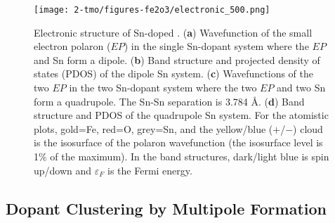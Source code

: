 

\begin{figure}
    \centering
    \texttt{[image: 2-tmo/figures-fe2o3/electronic\_500.png]} %
    \caption{Electronic structure of Sn-doped . (\textbf{a}) Wavefunction of the small electron polaron ($EP$) in the single Sn-dopant system where the $EP$ and Sn form a dipole. (\textbf{b}) Band structure and projected density of states (PDOS) of the dipole Sn system. (\textbf{c}) Wavefunctions of the two $EP$ in the two Sn-dopant system where the two $EP$ and two Sn form a quadrupole.
    The Sn-Sn separation is 3.784 {\AA}.
    (\textbf{d}) Band structure and PDOS of the quadrupole Sn system. For the atomistic plots, gold=Fe, red=O, grey=Sn, and the yellow/blue ($+$/$-$) cloud is the isosurface of the polaron wavefunction (the isosurface level is 1\% of the maximum). In the band structures, dark/light blue is spin up/down and $\varepsilon_F$ is the Fermi energy.
    }
    \label{fig:electronic}
\end{figure}

\subsection{Dopant Clustering by Multipole Formation}
%


